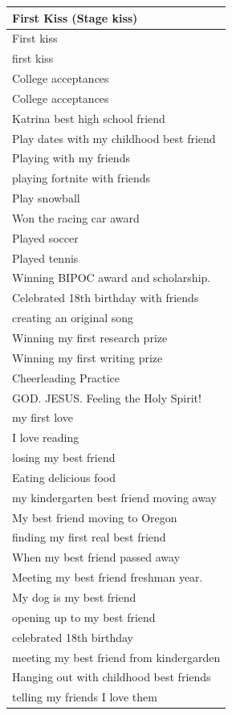 \documentclass[
  .7em,
  letterpaper,
  DIV=11,
  numbers=noendperiod]{scrartcl}
\begin{document}
\begin{table}
\begin{tabular}{l}
First Kiss (Stage kiss)\\
\hline
First kiss\\
\hline
first kiss\\
\hline
College acceptances\\
\hline
College acceptances\\
\hline
Katrina best high school friend\\
\hline
Play dates with my childhood best friend\\
\hline
Playing with my friends\\
\hline
playing fortnite with friends\\
\hline
Play snowball\\
\hline
Won the racing car award\\
\hline
Played soccer\\
\hline
Played tennis\\
\hline
Winning BIPOC award and scholarship.\\
\hline
Celebrated 18th birthday with friends\\
\hline
creating an original song\\
\hline
Winning my first research prize\\
\hline
Winning my first writing prize\\
\hline
Cheerleading Practice\\
\hline
GOD. JESUS. Feeling the Holy Spirit!\\
\hline
my first love\\
\hline
I love reading\\
\hline
losing my best friend\\
\hline
Eating delicious food\\
\hline
my kindergarten best friend moving away\\
\hline
My best friend moving to Oregon\\
\hline
finding my first real best friend\\
\hline
When my best friend passed away\\
\hline
Meeting my best friend freshman year.\\
\hline
My dog is my best friend\\
\hline
opening up to my best friend\\
\hline
celebrated 18th birthday\\
\hline
meeting my best friend from kindergarden\\
\hline
Hanging out with childhood best friends\\
\hline
telling my friends I love them\\

\end{tabular}
\end{table}
\end{document}
